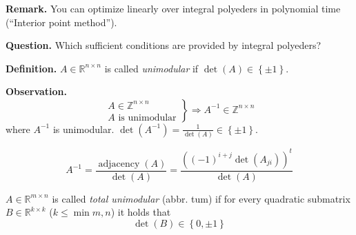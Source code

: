 \documentclass[a4paper]{article}
\theoremstyle{definition}
\newcommand{\set}[1]{\left\{#1\right\}}
\begin{document}
\textbf{Remark.}
  You can optimize linearly over integral polyeders in polynomial time (``Interior point method'').

\textbf{Question.}
  Which sufficient conditions are provided by integral polyeders?

\textbf{Definition.}
  $A \in \mathbb{R}^{n\times n}$ is called \emph{unimodular} if $\det(A) \in \set{\pm 1}$.

\textbf{Observation.}
  \[
    \left.\begin{array}{c}
      A \in \mathbb{Z}^{n\times n} \\
      A \text{ is unimodular}
    \end{array}\right\}
    \Rightarrow A^{-1} \in \mathbb{Z}^{n\times n}
  \]
  where $A^{-1}$ is unimodular. $\det(A^{-1}) = \frac{1}{\det(A)} \in \set{\pm 1}$.

\[ A^{-1} = \frac{\operatorname{adjacency}(A)}{\det(A)} = \frac{((-1)^{i+j} \det(A_{ji}))^t}{\det(A)} \]

$A \in \mathbb{R}^{m \times n}$ is called \emph{total unimodular} (abbr. tum) if for every quadratic submatrix $B \in \mathbb{R}^{k\times k}$ ($k \leq \min{m,n}$) it holds that
\[ \det(B) \in \set{0, \pm 1} \]
\end{document}
